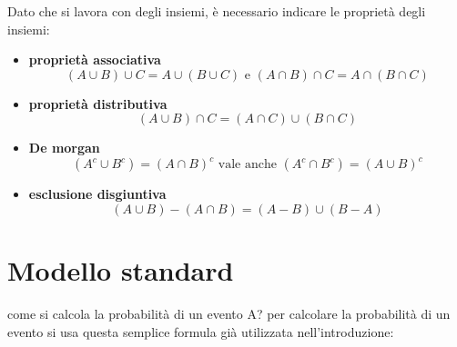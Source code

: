 \documentclass{article}
\begin{document}
    Dato che si lavora con degli insiemi, è necessario indicare le proprietà degli insiemi:
    \begin{itemize}
        \item \textbf{proprietà associativa}
            \begin{equation*}
                (A \cup B) \cup C = A \cup (B \cup C) \text{ e }(A \cap B) \cap C = A \cap (B \cap C)
            \end{equation*}
        
        \item \textbf{proprietà distributiva}
            \begin{equation*}
                (A \cup B) \cap C = (A \cap C) \cup (B \cap C)
            \end{equation*}
        
        \item \textbf{De morgan}
            \begin{equation*}
                (A^c \cup B^c) = (A \cap B)^c \text{ vale anche }(A^c \cap B^c) = (A \cup B)^c
            \end{equation*}
        
        \item \textbf{esclusione disgiuntiva}
            \begin{equation*}
                (A \cup B) - (A \cap B) = (A - B) \cup (B - A)
            \end{equation*}
        
    \end{itemize}

\section{Modello standard}
    come si calcola la probabilità di un evento A? per calcolare la probabilità di un evento si usa questa semplice formula già utilizzata nell'introduzione:
    
\end{document}
